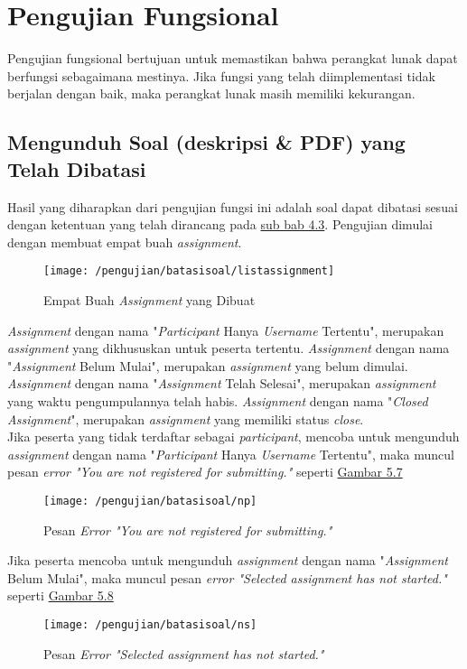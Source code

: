 \section{Pengujian Fungsional}
Pengujian fungsional bertujuan untuk memastikan bahwa perangkat lunak dapat berfungsi sebagaimana mestinya. Jika fungsi yang telah diimplementasi tidak berjalan dengan baik, maka perangkat lunak masih memiliki kekurangan.
	\subsection{Mengunduh Soal (deskripsi \& PDF) yang Telah Dibatasi}
	Hasil yang diharapkan dari pengujian fungsi ini adalah soal dapat dibatasi sesuai dengan ketentuan yang telah dirancang pada \hyperref[chap:batassoal]{sub bab 4.3}. Pengujian dimulai dengan membuat empat buah \textit{assignment}.
	\begin{figure}[H]
		\centering  
		\texttt{[image: /pengujian/batasisoal/listassignment]}  
		\caption[Empat Buah \textit{Assignment} yang Dibuat]{Empat Buah \textit{Assignment} yang Dibuat} 
		\label{fig:listassignment} 
	\end{figure}
	
	\textit{Assignment} dengan nama "\textit{Participant} Hanya \textit{Username} Tertentu", merupakan \textit{assignment} yang dikhususkan untuk peserta tertentu. \textit{Assignment} dengan nama "\textit{Assignment} Belum Mulai", merupakan \textit{assignment} yang belum dimulai. \textit{Assignment} dengan nama "\textit{Assignment} Telah Selesai", merupakan \textit{assignment} yang waktu pengumpulannya telah habis. \textit{Assignment} dengan nama "\textit{Closed Assignment}", merupakan \textit{assignment} yang memiliki status \textit{close}. \\
	
	Jika peserta yang tidak terdaftar sebagai \textit{participant}, mencoba untuk mengunduh \textit{assignment} dengan nama "\textit{Participant} Hanya \textit{Username} Tertentu", maka muncul pesan \textit{error "You are not registered for submitting."} seperti \hyperref[fig:np]{Gambar 5.7} 
	\begin{figure}[H]
		\centering  
		\texttt{[image: /pengujian/batasisoal/np]}  
		\caption[Pesan \textit{Error "You are not registered for submitting."}]{Pesan \textit{Error "You are not registered for submitting."}} 
		\label{fig:np} 
	\end{figure}

	Jika peserta mencoba untuk mengunduh \textit{assignment} dengan nama "\textit{Assignment} Belum Mulai", maka muncul pesan \textit{error "Selected assignment has not started."} seperti \hyperref[fig:ns]{Gambar 5.8} 
	\begin{figure}[H]
		\centering  
		\texttt{[image: /pengujian/batasisoal/ns]}  
		\caption[Pesan \textit{Error "Selected assignment has not started."}]{Pesan \textit{Error "Selected assignment has not started."}} 
		\label{fig:ns} 
	\end{figure}

